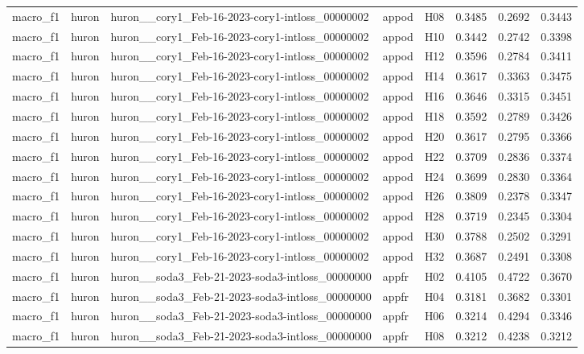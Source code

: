 \begin{table}[tbp]
\begin{tabular}{lllllrrr}
macro\_f1 & huron & huron\_\_cory1\_Feb-16-2023-cory1-intloss\_00000002 & appod & H08 & 0.3485 & 0.2692 & 0.3443 \\
macro\_f1 & huron & huron\_\_cory1\_Feb-16-2023-cory1-intloss\_00000002 & appod & H10 & 0.3442 & 0.2742 & 0.3398 \\
macro\_f1 & huron & huron\_\_cory1\_Feb-16-2023-cory1-intloss\_00000002 & appod & H12 & 0.3596 & 0.2784 & 0.3411 \\
macro\_f1 & huron & huron\_\_cory1\_Feb-16-2023-cory1-intloss\_00000002 & appod & H14 & 0.3617 & 0.3363 & 0.3475 \\
macro\_f1 & huron & huron\_\_cory1\_Feb-16-2023-cory1-intloss\_00000002 & appod & H16 & 0.3646 & 0.3315 & 0.3451 \\
macro\_f1 & huron & huron\_\_cory1\_Feb-16-2023-cory1-intloss\_00000002 & appod & H18 & 0.3592 & 0.2789 & 0.3426 \\
macro\_f1 & huron & huron\_\_cory1\_Feb-16-2023-cory1-intloss\_00000002 & appod & H20 & 0.3617 & 0.2795 & 0.3366 \\
macro\_f1 & huron & huron\_\_cory1\_Feb-16-2023-cory1-intloss\_00000002 & appod & H22 & 0.3709 & 0.2836 & 0.3374 \\
macro\_f1 & huron & huron\_\_cory1\_Feb-16-2023-cory1-intloss\_00000002 & appod & H24 & 0.3699 & 0.2830 & 0.3364 \\
macro\_f1 & huron & huron\_\_cory1\_Feb-16-2023-cory1-intloss\_00000002 & appod & H26 & 0.3809 & 0.2378 & 0.3347 \\
macro\_f1 & huron & huron\_\_cory1\_Feb-16-2023-cory1-intloss\_00000002 & appod & H28 & 0.3719 & 0.2345 & 0.3304 \\
macro\_f1 & huron & huron\_\_cory1\_Feb-16-2023-cory1-intloss\_00000002 & appod & H30 & 0.3788 & 0.2502 & 0.3291 \\
macro\_f1 & huron & huron\_\_cory1\_Feb-16-2023-cory1-intloss\_00000002 & appod & H32 & 0.3687 & 0.2491 & 0.3308 \\
macro\_f1 & huron & huron\_\_soda3\_Feb-21-2023-soda3-intloss\_00000000 & appfr & H02 & 0.4105 & 0.4722 & 0.3670 \\
macro\_f1 & huron & huron\_\_soda3\_Feb-21-2023-soda3-intloss\_00000000 & appfr & H04 & 0.3181 & 0.3682 & 0.3301 \\
macro\_f1 & huron & huron\_\_soda3\_Feb-21-2023-soda3-intloss\_00000000 & appfr & H06 & 0.3214 & 0.4294 & 0.3346 \\
macro\_f1 & huron & huron\_\_soda3\_Feb-21-2023-soda3-intloss\_00000000 & appfr & H08 & 0.3212 & 0.4238 & 0.3212 \\

\end{tabular}
\end{table}
